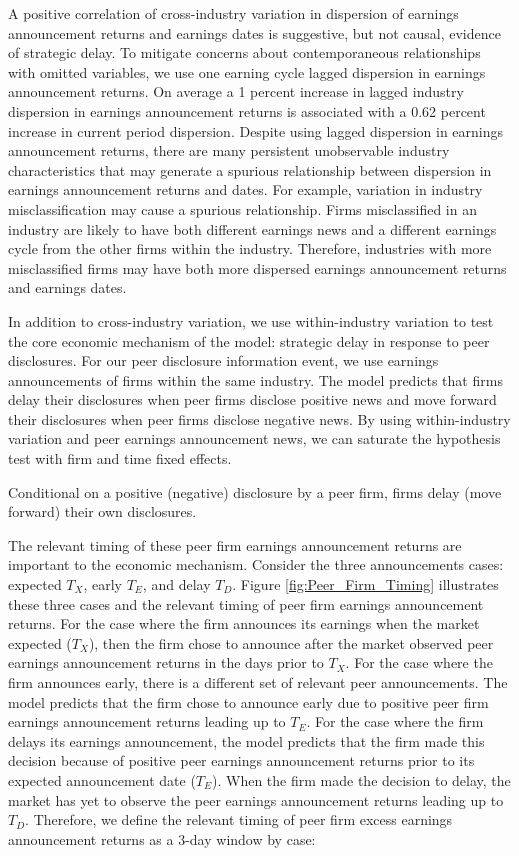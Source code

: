 \documentclass[authoryear,letterpaper,english,12pt]{elsarticle}
\begin{document}
A positive correlation of cross-industry variation in dispersion of earnings announcement returns and earnings dates is suggestive, but not causal, evidence of strategic delay. To mitigate concerns about contemporaneous relationships with omitted variables, we use one earning cycle lagged dispersion in earnings announcement returns. On average a 1 percent increase in lagged industry dispersion in earnings announcement returns is associated with a 0.62 percent increase in current period dispersion. Despite using lagged dispersion in earnings announcement returns, there are many persistent unobservable industry characteristics that may generate a spurious relationship between dispersion in earnings announcement returns and dates. For example, variation in industry misclassification may cause a spurious relationship. Firms misclassified in an industry are likely to have both different earnings news and a different earnings cycle from the other firms within the industry. Therefore, industries with more misclassified firms may have both more dispersed earnings announcement returns and earnings dates. 

In addition to cross-industry variation, we use within-industry variation to test the core economic mechanism of the model: strategic delay in response to peer disclosures. For our peer disclosure information event, we use earnings announcements of firms within the same industry. The model predicts that firms delay their disclosures when peer firms disclose positive news and move forward their disclosures when peer firms disclose negative news. By using within-industry variation and peer earnings announcement news, we can saturate the hypothesis test with firm and time fixed effects. 

\begin{hypothesis}\label{hyp:withinindustry}
Conditional on a positive (negative) disclosure by a peer firm, firms delay (move forward) their own disclosures.
\end{hypothesis}

The relevant timing of these peer firm earnings announcement returns are important to the economic mechanism. Consider the three announcements cases: expected $T_{X}$, early $T_{E}$, and delay $T_{D}$. Figure \ref{fig:Peer_Firm_Timing} illustrates these three cases and the relevant timing of peer firm earnings announcement returns. For the case where the firm announces its earnings when the market expected ($T_{X}$), then the firm chose to announce after the market observed peer earnings announcement returns in the days prior to $T_{X}$. For the case where the firm announces early, there is a different set of relevant peer announcements. The model predicts that the firm chose to announce early due to positive peer firm earnings announcement returns leading up to $T_{E}$. For the case where the firm delays its earnings announcement, the model predicts that the firm made this decision because of positive peer earnings announcement returns prior to its expected announcement date ($T_{E}$). When the firm made the decision to delay, the market has yet to observe the peer earnings announcement returns leading up to $T_{D}$. Therefore, we define the relevant timing of peer firm excess earnings announcement returns as a 3-day window by case:
\end{document}

